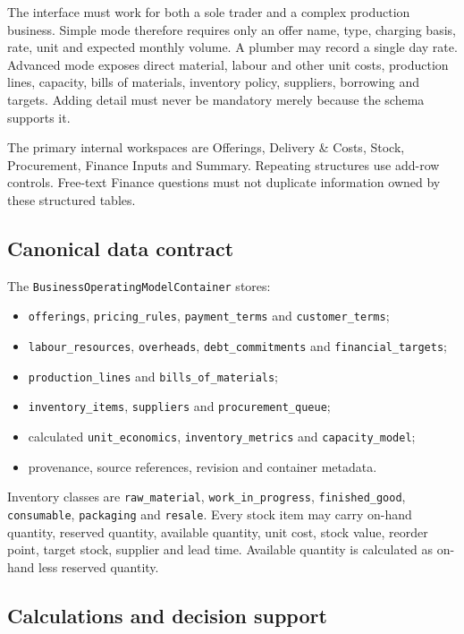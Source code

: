 The interface must work for both a sole trader and a complex production business.  Simple mode therefore requires only an offer name, type, charging basis, rate, unit and expected monthly volume.  A plumber may record a single day rate.  Advanced mode exposes direct material, labour and other unit costs, production lines, capacity, bills of materials, inventory policy, suppliers, borrowing and targets.  Adding detail must never be mandatory merely because the schema supports it.

The primary internal workspaces are Offerings, Delivery \& Costs, Stock, Procurement, Finance Inputs and Summary.  Repeating structures use add-row controls.  Free-text Finance questions must not duplicate information owned by these structured tables.

\subsection{Canonical data contract}

The \texttt{BusinessOperatingModelContainer} stores:
\begin{itemize}
  \item \texttt{offerings}, \texttt{pricing\_rules}, \texttt{payment\_terms} and \texttt{customer\_terms};
  \item \texttt{labour\_resources}, \texttt{overheads}, \texttt{debt\_commitments} and \texttt{financial\_targets};
  \item \texttt{production\_lines} and \texttt{bills\_of\_materials};
  \item \texttt{inventory\_items}, \texttt{suppliers} and \texttt{procurement\_queue};
  \item calculated \texttt{unit\_economics}, \texttt{inventory\_metrics} and \texttt{capacity\_model};
  \item provenance, source references, revision and container metadata.
\end{itemize}

Inventory classes are \texttt{raw\_material}, \texttt{work\_in\_progress}, \texttt{finished\_good}, \texttt{consumable}, \texttt{packaging} and \texttt{resale}.  Every stock item may carry on-hand quantity, reserved quantity, available quantity, unit cost, stock value, reorder point, target stock, supplier and lead time.  Available quantity is calculated as on-hand less reserved quantity.

\subsection{Calculations and decision support}

